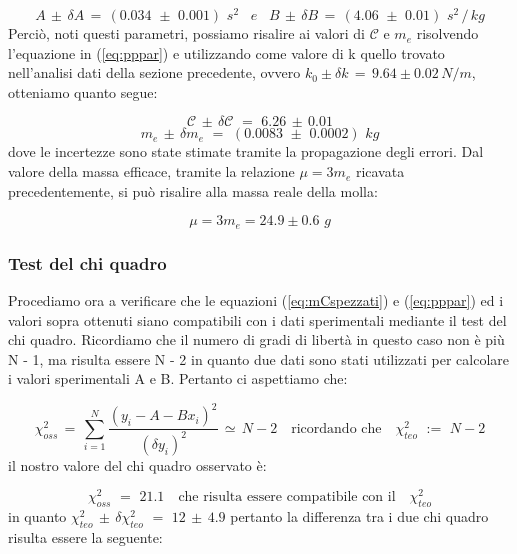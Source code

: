 \begin{equation*}
	A \,\pm\, \delta A \,=\, (0.034 \,\, \pm \,\, 0.001) \,\,s^2 \,\,\,\,\, e \,\,\,\,\,
	B \,\pm\, \delta B \,=\, (4.06 \,\, \pm \,\, 0.01) \,\,s^2 \,/\, kg
\end{equation*}
%
Perciò, noti questi parametri, possiamo risalire ai valori di $\mathcal{C}$ e $m_e$ risolvendo l'equazione in (\ref{eq:pppar}) e utilizzando come valore di k quello trovato nell'analisi dati della sezione precedente, ovvero $k_0 \pm \delta k \,=\, 9.64 \pm 0.02 \, N/m$, otteniamo quanto segue:

\begin{equation*}
	\mathcal{C} \,\pm\, \delta \mathcal{C} \,\,=\,\, 6.26 \, \pm \, 0.01
\end{equation*}
%
\begin{equation*}
	m_e \, \pm \, \delta m_e \,\,=\,\, (0.0083 \,\, \pm \,\, 0.0002) \,\, kg
\end{equation*}
%
dove le incertezze sono state stimate tramite la propagazione degli errori. Dal valore della massa efficace, tramite la relazione $\mu = 3m_e$
ricavata precedentemente, si può risalire alla massa reale della molla:

\begin{equation*}
    \mu = 3m_e = 24.9 \pm 0.6 \,\, g
\end{equation*}

\subsubsection{Test del chi quadro}

Procediamo ora a verificare che le equazioni (\ref{eq:mCspezzati}) e (\ref{eq:pppar}) ed i valori sopra ottenuti siano compatibili con i dati sperimentali mediante il test del chi quadro. Ricordiamo che il numero di gradi di libertà in questo caso non è più N - 1, ma risulta essere N - 2 in quanto due dati sono stati utilizzati per calcolare i  valori sperimentali A e B. Pertanto ci aspettiamo che:

\begin{equation*}
	\chi_{oss}^2 \,=\, \sum_{i=1}^{N} \frac{(y_i - A - Bx_i)^2}{(\delta y_i)^2} \,\simeq\, N - 2 \quad \text{ricordando che} \quad \chi_{teo}^2 \,\,:=\,\, N - 2
\end{equation*}
%
il nostro valore del chi quadro osservato è:

\begin{equation*}
	\chi_{oss}^2 \,\,=\,\, 21.1 \quad \text{che risulta essere compatibile con il} \quad \chi_{teo}^2
\end{equation*}
%
in quanto $\chi_{teo}^2 \, \pm \, \delta \chi_{teo}^2 \,\,=\,\, 12 \, \pm \, 4.9$ pertanto la differenza tra i due chi quadro risulta essere la seguente:

